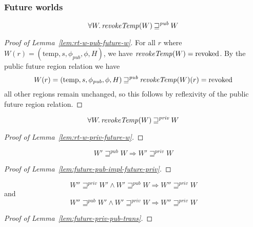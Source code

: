 \documentclass[a4paper]{article}
\newcommand{\var}[1]{\mathit{#1}}
\newcommand{\plainfun}[2]{
  \ifthenelse{\equal{#2}{}}
  {\mathit{#1}}
  {\mathit{#1}(#2)}
}
\newcommand{\revokeTemp}[1]{\plainfun{revokeTemp}{#1}}
\newcommand{\pub}{\var{pub}}
\newcommand{\futurewk}{\mathbin{\sqsupseteq}^{\var{pub}}}
\newcommand{\futurestr}{\mathbin{\sqsupseteq}^{\var{priv}}}
\newcommand{\plainview}[1]{\mathrm{#1}}
\newcommand{\temp}{\plainview{temp}}
\newcommand{\revoked}{\plainview{revoked}}
\begin{document}
\subsubsection{Future worlds}
\begin{lemma}
  \label{lem:rt-w-pub-future-w}
  \[
    \forall W \ldotp \revokeTemp{W} \futurewk W
  \]
\end{lemma}
\begin{proof}[Proof of Lemma~\ref{lem:rt-w-pub-future-w}]
  For all $r$ where $W(r) = (\temp,s,\phi_\pub,\phi,H)$, we have $\revokeTemp{W} = \revoked$. By the public future region relation we have
  \[
    W(r) = (\temp,s,\phi_\pub,\phi,H) \futurewk \revokeTemp{W}(r) = \revoked
  \]
  all other regions remain unchanged, so this follows by reflexivity of the public future region relation.
\end{proof}

\begin{lemma}
  \label{lem:rt-w-priv-future-w}
  \[
    \forall W \ldotp \wrev{W} \futurestr W
  \]
\end{lemma}
\begin{proof}[Proof of Lemma~\ref{lem:rt-w-priv-future-w}]
\end{proof}

\begin{lemma}
  \label{lem:future-pub-impl-future-priv}
  \[
   W' \futurewk W \Rightarrow W' \futurestr W
  \]
\end{lemma}
\begin{proof}[Proof of Lemma~\ref{lem:future-pub-impl-future-priv}]
\end{proof}

\begin{lemma}
\[
  W'' \futurestr W' \land W' \futurewk W \Rightarrow W'' \futurestr W
\]
and
\[
  W'' \futurewk W' \land W' \futurestr W \Rightarrow W'' \futurestr W
\]
\end{lemma}
\begin{proof}[Proof of Lemma~\ref{lem:future-priv-pub-trans}]
\end{proof}
\end{document}
